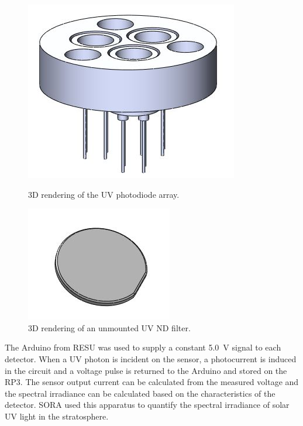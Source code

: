 \begin{figure}[!h]
  \begin{minipage}[c]{0.49\linewidth}
    \includegraphics[scale=1, width=.5\textwidth]{Figures/uvapparatus.JPG}
    \caption{3D rendering of the UV photodiode array.} %
    \label{fig:UVArray}
  \end{minipage}
  \hfill
  \begin{minipage}[c]{0.49\linewidth}
    \includegraphics[scale=1, width=.5\textwidth]{Figures/uv_filter.JPG}
    \caption{3D rendering of an unmounted UV ND filter.} %
    \label{fig:NDFilter}
  \end{minipage}
\end{figure}

The Arduino from RESU was used to supply a constant \SI{5.0}{\volt} signal to each detector. When a UV photon is incident on the sensor, a photocurrent is induced in the circuit and a voltage pulse is returned to the Arduino and stored on the RP3. The sensor output current can be calculated from the measured voltage and the spectral irradiance can be calculated based on the characteristics of the detector. SORA used this apparatus to quantify the spectral irradiance of solar UV light in the stratosphere.
